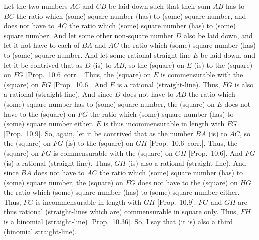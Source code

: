 \begin{Parallel}{}{}
{Let the two numbers $AC$ and $CB$ be laid down such that their sum
$AB$ has to $BC$ the ratio which (some) square number (has) to
(some) square number, and does not have to $AC$ the ratio which (some)
square number (has) to (some) square number. And let some other non-square number
$D$ also be laid down, and let it not have to each of $BA$ and $AC$ the
ratio which (some) square number (has) to (some) square number.
And let some rational straight-line $E$ be laid down, and let it be
contrived that as $D$ (is) to $AB$, so the (square) on $E$ (is) to
the (square) on $FG$ [Prop.~10.6~corr.]. Thus,
the (square) on $E$ is commensurable with the (square) on $FG$ [Prop.~10.6]. And $E$ is a rational (straight-line).
Thus, $FG$ is also a rational (straight-line). And since $D$ does not have to
$AB$ the ratio which (some) square number has to (some) square number,
the (square) on $E$ does not have to the (square) on $FG$ the ratio
which (some) square number (has) to (some) square number either.
$E$ is thus incommensurable in length with $FG$ [Prop.~10.9]. So, again, let it be contrived that
as the number $BA$ (is) to $AC$, so the (square) on  $FG$ (is) to the
(square) on $GH$ [Prop.~10.6~corr.]. Thus,
the (square) on $FG$ is commensurable with the (square) on $GH$
[Prop.~10.6]. And $FG$ (is) a rational (straight-line).
Thus, $GH$ (is) also a rational (straight-line). And since $BA$ does not have to $AC$ the ratio which (some) square number (has) to (some) square number, the (square) on $FG$  does not have to the (square) on $HG$
the ratio which (some) square number (has) to (some) square number either.
Thus, $FG$ is incommensurable in length with $GH$ [Prop.~10.9].  $FG$ and $GH$ are thus rational
(straight-lines which are) commensurable in square only. Thus,
$FH$ is a binomial (straight-line) [Prop.~10.36].
So, I say that (it is) also a third (binomial straight-line).

\epsfysize=1.1in
\centerline{}

}
\end{Parallel}
